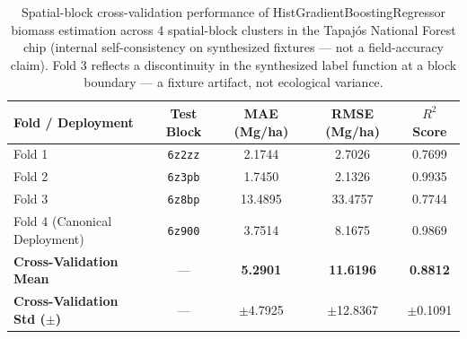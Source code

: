 \begin{table}[t]
\centering
\small
\caption{Spatial-block cross-validation performance of HistGradientBoostingRegressor biomass estimation across 4 spatial-block clusters in the Tapaj\'{o}s National Forest chip (internal self-consistency on synthesized fixtures — not a field-accuracy claim). Fold 3 reflects a discontinuity in the synthesized label function at a block boundary — a fixture artifact, not ecological variance.}
\label{tab:model_metrics}
\begin{tabular}{lcccc}
\hline
\textbf{Fold / Deployment} & \textbf{Test Block} & \textbf{MAE (Mg/ha)} & \textbf{RMSE (Mg/ha)} & \textbf{$R^2$ Score} \\
\hline
Fold 1 & \texttt{6z2zz} & 2.1744 & 2.7026 & 0.7699 \\
Fold 2 & \texttt{6z3pb} & 1.7450 & 2.1326 & 0.9935 \\
Fold 3 & \texttt{6z8bp} & 13.4895 & 33.4757 & 0.7744 \\
Fold 4 (Canonical Deployment) & \texttt{6z900} & 3.7514 & 8.1675 & 0.9869 \\
\hline
\textbf{Cross-Validation Mean} & — & \textbf{5.2901} & \textbf{11.6196} & \textbf{0.8812} \\
\textbf{Cross-Validation Std ($\pm$)} & — & $\pm$4.7925 & $\pm$12.8367 & $\pm$0.1091 \\
\hline
\end{tabular}
\end{table}
